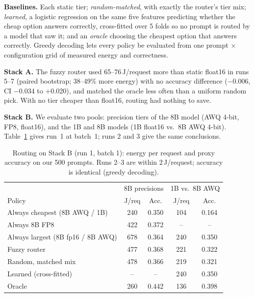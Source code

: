 \documentclass[conference]{IEEEtran}
\begin{document}
\textbf{Baselines.} Each static tier; \emph{random-matched}, with exactly the router's tier mix; \emph{learned}, a logistic regression on the same five features predicting whether the cheap option answers correctly, cross-fitted over 5 folds so no prompt is routed by a model that saw it; and an \emph{oracle} choosing the cheapest option that answers correctly. Greedy decoding lets every policy be evaluated from one prompt $\times$ configuration grid of measured energy and correctness.

\textbf{Stack A.} The fuzzy router used 65--76\,J/request more than static float16 in runs 5--7 (paired bootstrap; 38--49\% more energy) with no accuracy difference ($-$0.006, CI $-$0.034 to $+$0.020), and matched the oracle less often than a uniform random pick. With no tier cheaper than float16, routing had nothing to save.

\textbf{Stack B.} We evaluate two pools: precision tiers of the 8B model (AWQ 4-bit, FP8, float16), and the 1B and 8B models (1B float16 vs.\ 8B AWQ 4-bit). Table~\ref{tab:route} gives run~1 at batch~1; runs 2 and 3 give the same conclusions.

\begin{table}[t]
\caption{Routing on Stack B (run 1, batch 1): energy per request and proxy accuracy on our 500 prompts. Runs 2--3 are within 2\,J/request; accuracy is identical (greedy decoding).}
\label{tab:route}
\centering\small
\setlength{\tabcolsep}{3pt}
\begin{tabular}{lcc|cc}
\toprule
 & \multicolumn{2}{c|}{8B precisions} & \multicolumn{2}{c}{1B vs.\ 8B AWQ} \\
Policy & J/req & Acc. & J/req & Acc. \\
\midrule
Always cheapest (8B AWQ / 1B) & 240 & 0.350 & 104 & 0.164 \\
Always 8B FP8 & 422 & 0.372 & -- & -- \\
Always largest (8B fp16 / 8B AWQ) & 678 & 0.364 & 240 & 0.350 \\
Fuzzy router & 477 & 0.368 & 221 & 0.322 \\
Random, matched mix & 478 & 0.366 & 219 & 0.321 \\
Learned (cross-fitted) & -- & -- & 240 & 0.350 \\
Oracle & 260 & 0.442 & 136 & 0.398 \\
\bottomrule
\end{tabular}
\end{table}
\end{document}
